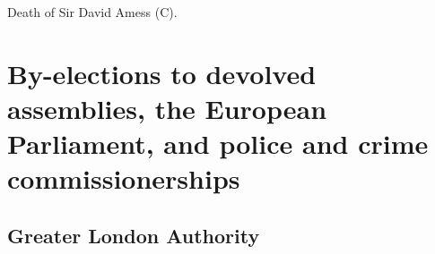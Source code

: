 \documentclass[a4paper,openany]{book}
\begin{document}

Death of Sir David Amess (C).

%
%
%

\chapter{By-elections to devolved assemblies, the European Parliament, and police and crime commissionerships}

\section{Greater London Authority}
\end{document}
